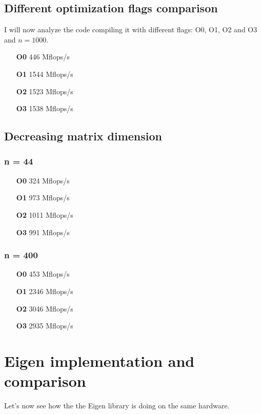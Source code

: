 \documentclass[11pt,a4paper,oneside,titlepage,openright]{book}
\begin{document}
\section{Different optimization flags comparison}
I will now analyze the code compiling it with different flags: O0, O1, O2 and O3 and $n = 1000$.

\begin{itemize}
\item[\textbf{O0}] 446  Mflops/s
\item[\textbf{O1}] 1544 Mflops/s
\item[\textbf{O2}] 1523 Mflops/s
\item[\textbf{O3}] 1538 Mflops/s
\end{itemize}

\section{Decreasing matrix dimension} 

\subsection{n = 44}
\begin{itemize}
\item[\textbf{O0}] 324  Mflops/s
\item[\textbf{O1}] 973 Mflops/s
\item[\textbf{O2}] 1011 Mflops/s
\item[\textbf{O3}] 991 Mflops/s
\end{itemize}

\subsection{ n = 400}

\begin{itemize}
\item[\textbf{O0}] 453  Mflops/s
\item[\textbf{O1}] 2346 Mflops/s
\item[\textbf{O2}] 3046 Mflops/s
\item[\textbf{O3}] 2935 Mflops/s
\end{itemize}


\chapter{Eigen implementation and comparison}

Let's now see how the the Eigen library is doing on the same hardware. 
\end{document}
